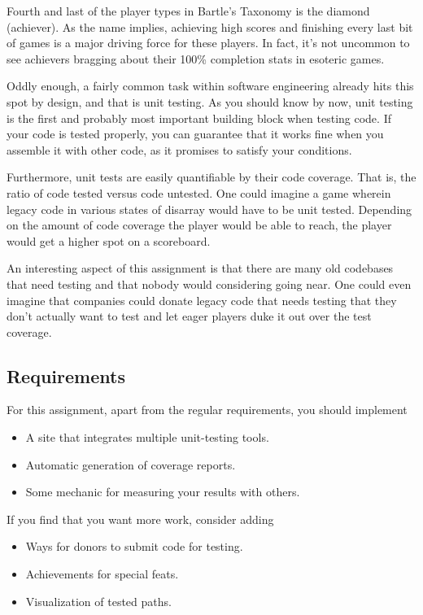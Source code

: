 \begin{refsection}
    Fourth and last of the player types in Bartle's Taxonomy\supercite{bartle} is the diamond (achiever). As the name implies, achieving high scores and finishing every last bit of games is a major driving force for these players. In fact, it's not uncommon to see achievers bragging about their 100\% completion stats in esoteric games.

    Oddly enough, a fairly common task within software engineering already hits this spot by design, and that is unit testing. As you should know by now, unit testing is the first and probably most important building block when testing code. If your code is tested properly, you can guarantee that it works fine when you assemble it with other code, as it promises to satisfy your conditions.

    Furthermore, unit tests are easily quantifiable by their code coverage. That is, the ratio of code tested versus code untested. One could imagine a game wherein legacy code in various states of disarray would have to be unit tested. Depending on the amount of code coverage the player would be able to reach, the player would get a higher spot on a scoreboard.

    An interesting aspect of this assignment is that there are many old codebases that need testing and that nobody would considering going near. One could even imagine that companies could donate legacy code that needs testing that they don't actually want to test and let eager players duke it out over the test coverage.

    \subsection*{Requirements}
    For this assignment, apart from the regular requirements, you should implement
    \begin{itemize}
        \item A site that integrates multiple unit-testing tools.
        \item Automatic generation of coverage reports.
        \item Some mechanic for measuring your results with others.
    \end{itemize}
    If you find that you want more work, consider adding
    \begin{itemize}
        \item Ways for donors to submit code for testing.
        \item Achievements for special feats.
        \item Visualization of tested paths.
    \end{itemize}

\printbibliography[heading=subbibliography]
\end{refsection}
